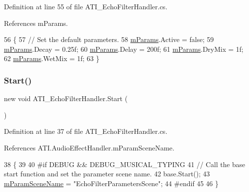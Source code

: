 Definition at line 55 of file A\+T\+I\+\_\+\+Echo\+Filter\+Handler.\+cs.



References m\+Params.


\begin{DoxyCode}
56     \{
57         \textcolor{comment}{// Set the default parameters.}
58         \hyperlink{class_a_t_i___echo_filter_handler_afe435170679cf364951083e6f6ffab36}{mParams}.Active = \textcolor{keyword}{false};
59         \hyperlink{class_a_t_i___echo_filter_handler_afe435170679cf364951083e6f6ffab36}{mParams}.Decay = 0.25f;
60         \hyperlink{class_a_t_i___echo_filter_handler_afe435170679cf364951083e6f6ffab36}{mParams}.Delay = 200f;
61         \hyperlink{class_a_t_i___echo_filter_handler_afe435170679cf364951083e6f6ffab36}{mParams}.DryMix = 1f;
62         \hyperlink{class_a_t_i___echo_filter_handler_afe435170679cf364951083e6f6ffab36}{mParams}.WetMix = 1f;
63     \}
\end{DoxyCode}
\mbox{\label{class_a_t_i___echo_filter_handler_a81ac0206d565c1c120dbe9e122474e8e}} 
\subsubsection{\texorpdfstring{Start()}{Start()}}
{\footnotesize\ttfamily new void A\+T\+I\+\_\+\+Echo\+Filter\+Handler.\+Start (\begin{DoxyParamCaption}{ }\end{DoxyParamCaption})\hspace{0.3cm}{\ttfamily [private]}}



Definition at line 37 of file A\+T\+I\+\_\+\+Echo\+Filter\+Handler.\+cs.



References A\+T\+I.\+Audio\+Effect\+Handler.\+m\+Param\+Scene\+Name.


\begin{DoxyCode}
38     \{
39 
40 \textcolor{preprocessor}{#if DEBUG && DEBUG\_MUSICAL\_TYPING}
41         \textcolor{comment}{// Call the base start function and set the parameter scene name.}
42         base.Start();
43         \hyperlink{class_a_t_i_1_1_audio_effect_handler_a674c38f29ef923e6c9487c2dc991a8b6}{mParamSceneName} = \textcolor{stringliteral}{"EchoFilterParametersScene"};
44 \textcolor{preprocessor}{#endif}
45 
46     \}
\end{DoxyCode}
\mbox{\label{class_a_t_i___echo_filter_handler_aefc1d2ab19273b9606c09eff2db13165}} 
